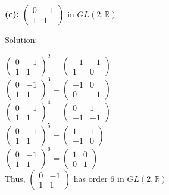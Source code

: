 \documentclass{article} %
\begin{document}
\textbf{(c): } $\left( \begin{matrix} 0 & -1 \\ 1 & 1\end{matrix}\right)$ in $GL(2,\mathbb{R})$
\begin{addmargin}[1em]{0em}
\underline{Solution}: 
\begin{addmargin}[1em]{0em}
$\left( \begin{matrix} 
0 & -1 \\ 
1 & 1
\end{matrix}\right)^2 = 
\left( \begin{matrix}
 -1 & -1 \\ 
 1 & 0
 \end{matrix}\right)$
\\$\left( \begin{matrix} 
0 & -1 \\ 
1 & 1
\end{matrix}\right)^3 = 
\left( \begin{matrix}
 -1 & 0 \\
 0 & -1
 \end{matrix}\right)$
\\$\left( \begin{matrix} 
0 & -1 \\ 
1 & 1
\end{matrix}\right)^4 = 
\left( \begin{matrix}
 0 & 1 \\
 -1 & -1
 \end{matrix}\right)$
\\$\left( \begin{matrix} 
0 & -1 \\ 
1 & 1
\end{matrix}\right)^5 = 
\left( \begin{matrix}
 1 & 1 \\
 -1 & 0
 \end{matrix}\right)$
\\$\left( \begin{matrix} 
0 & -1 \\ 
1 & 1
\end{matrix}\right)^6 = 
\left( \begin{matrix}
 1 & 0 \\
 0 & 1
 \end{matrix}\right)$
\\Thus, $\left(\begin{matrix}0&-1\\1&1\end{matrix}\right)$ has order 6 in $GL(2, \mathbb{R})$
\end{addmargin}
\end{addmargin} 
\end{document}
